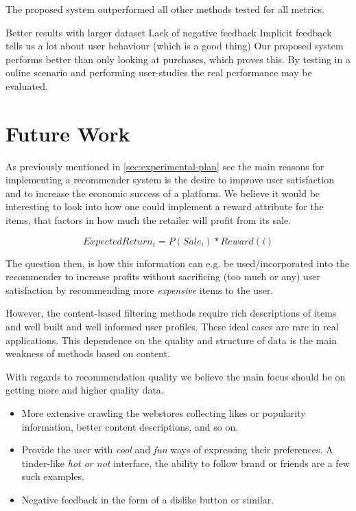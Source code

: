 The proposed system outperformed all other methods tested for all metrics. 



Better results with larger dataset
Lack of negative feedback
Implicit feedback tells us a lot about user behaviour (which is a good thing)
Our proposed system performs better than only looking at purchases, which
proves this.
By testing in a online scenario and performing user-studies the real
performance may be evaluated.

\clearpage
\section{Future Work}

As previously mentioned in \ref{sec:experimental-plan} sec the main reasons for
implementing a recommender system is the desire to improve user satisfaction
and to increase the economic success of a platform.  We believe it would be
interesting to look into how one could implement a reward attribute for the
items, that factors in how much the retailer will profit from its sale.

\begin{equation}
ExpectedReturn_i = P(Sale_i) * Reward(i)
\end{equation}

The question then, is how this information can e.g. be used/incorporated into
the recommender to increase profits without sacrificing (too much or any) user
satisfaction by recommending more \emph{expensive} items to the user.


However, the content-based filtering methods require rich descriptions of items
and well built and well informed user profiles. These ideal cases are rare in
real applications. This dependence on the quality and structure of data is the
main weakness of methods based on content.

With regards to recommendation quality we believe the main focus should be on
getting more and higher quality data.

\begin{itemize}

\item More extensive crawling the webstores collecting likes or popularity
information, better content descriptions, and so on.

\item Provide the user with \emph{cool} and \emph{fun} ways of expressing their
preferences. A tinder-like \emph{hot or not} interface, the ability to follow
brand or friends are a few such examples.

\item Negative feedback in the form of a dislike button or similar.
\end{itemize}

